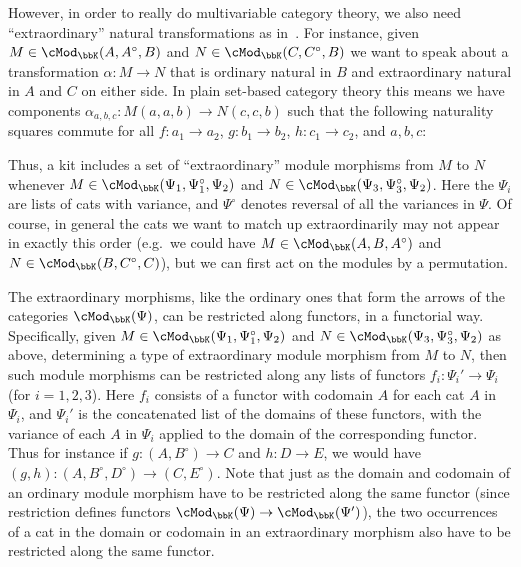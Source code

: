 \documentclass{amsart}
\newcommand{\K}{\bbK}
\let\mod\cMod
\def\modk{\mod_\K}
\renewcommand{\o}{^{\circ}}
\begin{document}
However, in order to really do multivariable category theory, we also need ``extra\-ordinary'' natural transformations as in~\cite{ek:gen-funct-calc}.
For instance, given $M\in\modk(A,A\o,B)$ and $N\in \modk(C,C\o,B)$ we want to speak about a transformation $\alpha:M\to N$ that is ordinary natural in $B$ and extraordinary natural in $A$ and $C$ on either side.
In plain set-based category theory this means we have components $\alpha_{a,b,c}:M(a,a,b) \to N(c,c,b)$ such that the following naturality squares commute for all $f:a_1\to a_2$, $g:b_1\to b_2$, $h:c_1\to c_2$, and $a,b,c$:
Thus, a kit includes a set of ``extraordinary'' module morphisms from $M$ to $N$ whenever $M\in \modk(\Psi_1, \Psi_1\o, \Psi_2)$ and $N\in\modk(\Psi_3, \Psi_3\o, \Psi_2)$.
Here the $\Psi_i$ are lists of cats with variance, and $\Psi\o$ denotes reversal of all the variances in $\Psi$.
Of course, in general the cats we want to match up extraordinarily may not appear in exactly this order (e.g.\ we could have $M\in \modk(A,B,A\o)$ and $N\in \modk(B,C\o,C)$), but we can first act on the modules by a permutation.

The extraordinary morphisms, like the ordinary ones that form the arrows of the categories $\modk(\Psi)$, can be restricted along functors, in a functorial way.
Specifically, given $M\in \modk(\Psi_1, \Psi_1\o,\Psi_2)$ and $N\in\modk(\Psi_3, \Psi_3\o,\Psi_2)$ as above, determining a type of extraordinary module morphism from $M$ to $N$, then such module morphisms can be restricted along any lists of functors $f_i:\Psi_i' \to \Psi_i$ (for $i=1,2,3$).
Here $f_i$ consists of a functor with codomain $A$ for each cat $A$ in $\Psi_i$, and $\Psi_i'$ is the concatenated list of the domains of these functors, with the variance of each $A$ in $\Psi_i$ applied to the domain of the corresponding functor.
Thus for instance if $g:(A,B\o) \to C$ and $h:D\to E$, we would have $(g,h):(A,B\o,D\o) \to (C,E\o)$.
Note that just as the domain and codomain of an ordinary module morphism have to be restricted along the same functor (since restriction defines functors $\modk(\Psi) \to \modk(\Psi')$), the two occurrences of a cat in the domain or codomain in an extraordinary morphism also have to be restricted along the same functor.
\end{document}
